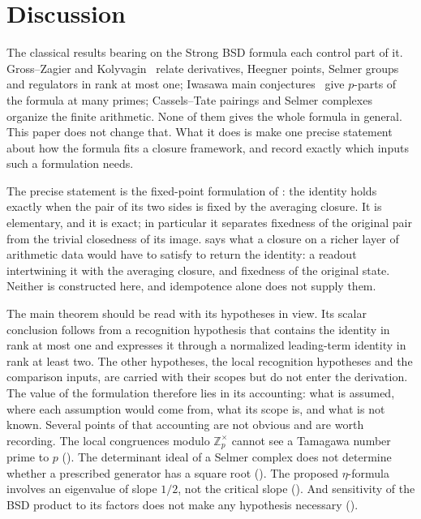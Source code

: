 \documentclass[11pt]{article}
\theoremstyle{definition}
\newcommand{\Zp}{\mathbb{Z}_p}
\begin{document}
  \section{Discussion}\label{sec:discussion}


The classical results bearing on the Strong BSD formula each control part
of it.  Gross--Zagier and Kolyvagin~\citep{GrossZagier1986,Kolyvagin1989}
relate derivatives, Heegner points, Selmer groups and regulators in rank
at most one; Iwasawa main conjectures~\citep{SkinnerUrban2014} give
$p$-parts of the formula at many primes; Cassels--Tate pairings and
Selmer complexes~\citep{Flach1990,Nekovar2006} organize the finite
arithmetic.  None of them gives the whole formula in general.  This paper
does not change that.  What it does is make one precise statement about
how the formula fits a closure framework, and record exactly which inputs
such a formulation needs.

The precise statement is the fixed-point formulation of
: the identity holds exactly
when the pair of its two sides is fixed by the averaging closure.  It is
elementary, and it is exact; in particular it separates fixedness of the
original pair from the trivial closedness of its image.
 says what a closure on a richer
layer of arithmetic data would have to satisfy to return the identity: a
readout intertwining it with the averaging closure, and fixedness of the
original state.  Neither is constructed here, and idempotence alone does
not supply them.

The main theorem should be read with its hypotheses in view.  Its scalar
conclusion follows from a recognition hypothesis that contains the
identity in rank at most one and expresses it through a normalized
leading-term identity in rank at least two.  The other hypotheses, the
local recognition hypotheses and the comparison inputs, are carried with
their scopes but do not enter the derivation.  The value of the
formulation therefore lies in its accounting: what is assumed, where each
assumption would come from, what its scope is, and what is not known.
Several points of that accounting are not obvious and are worth
recording.  The local congruences modulo $\Zp^\times$ cannot see a
Tamagawa number prime to $p$ ().  The
determinant ideal of a Selmer complex does not determine whether a
prescribed generator has a square root ().  The
proposed $\eta$-formula involves an eigenvalue of slope $1/2$, not the
critical slope ().  And sensitivity of the BSD
product to its factors does not make any hypothesis necessary
().
\end{document}
